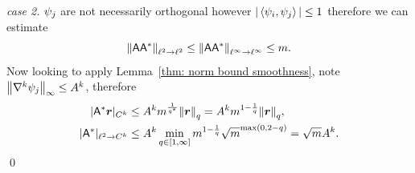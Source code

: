 \documentclass[smallextended]{svjour3}
\newcommand{\norm}[1]{{\left\lVert #1 \right\rVert}}
\newcommand{\IP}[2]{\left\langle #1,#2 \right\rangle}
\newcommand{\1}{\F{1}}
\newcommand*{\vard}[1]{%
	\IfEqCase{#1}{%
		{0}{\varphi}%
		{1}{\psi}%
	}[\varphi #1]%
}
\newcommand*{\varx}[1]{%
	\IfEqCase{#1}{%
		{0}{x}%
		{1}{y}%
		{2}{z}%
		{3}{r}%
	}[x#1]%
}
\newcommand*{\Vars}[1]{%
	\IfEqCase{#1}{%
		{0}{\mathrm{A}}%
		{1}{\mathrm{B}}%
		{2}{\Gamma}%
		{3}{A}%
		{4}{B}%
		{5}{C}%
	}[K#1]%
}
\newcommand*{\vvarx}[1]{\vec{\varx{#1}}}
\begin{document}
	\begin{proof}[case 2]
		$\vard1_j$ are not necessarily orthogonal however $|\IP{\vard1_i}{\vard1_j}|\leq 1$ therefore we can estimate
		\begin{equation}
			\norm{\A\A^*}_{\ell^2\to\ell^2} \leq \norm{\A\A^*}_{\ell^\infty\to\ell^\infty} \leq m.
		\end{equation}
		Now looking to apply Lemma~\ref{thm: norm bound smoothness}, note $\norm{\nabla^k\vard1_j}_\infty \leq \Vars3^k$, therefore
		\begin{align}
			|\A^*\vvarx3|_{C^k}&\leq \Vars3^k m^{\frac1{q^*}}\norm{\vvarx3}_q = \Vars3^k m^{1-\frac1{q}}\norm{\vvarx3}_q,
			\\|\A^*|_{\ell^2\to C^k} &\leq \Vars3^k \min_{q\in[1,\infty]}m^{1-\frac1q}\sqrt{m}^{\max(0,2-q)} = \sqrt{m}\Vars3^k.
		\end{align}
		\qed\end{proof}
	
\end{document}

